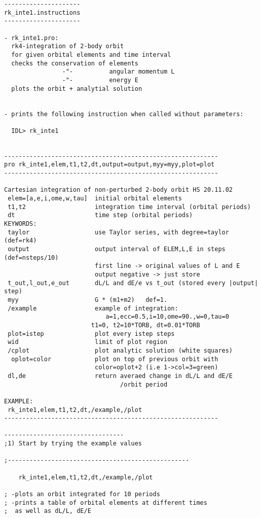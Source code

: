 \documentclass[12pt,landscape]{article}
\begin{document}
\begin{verbatim}
---------------------
rk_inte1.instructions
---------------------

- rk_inte1.pro:
  rk4-integration of 2-body orbit
  for given orbital elements and time interval 
  checks the conservation of elements
                -"-          angular momentum L
                -"-          energy E
  plots the orbit + analytial solution

                 
- prints the following instruction when called without parameters:
 
  IDL> rk_inte1


-----------------------------------------------------------
pro rk_inte1,elem,t1,t2,dt,output=output,myy=myy,plot=plot
-----------------------------------------------------------
 
Cartesian integration of non-perturbed 2-body orbit HS 20.11.02
 elem=[a,e,i,ome,w,tau]  initial orbital elements
 t1,t2                   integration time interval (orbital periods)
 dt                      time step (orbital periods)
KEYWORDS:
 taylor                  use Taylor series, with degree=taylor (def=rk4)
 output                  output interval of ELEM,L,E in steps (def=nsteps/10)
                         first line -> original values of L and E 
                         output negative -> just store  
 t_out,l_out,e_out       dL/L and dE/e vs t_out (stored every |output| step)
 myy                     G * (m1+m2)   def=1.
 /example                example of integration:
                            a=1,ecc=0.5,i=10,ome=90.,w=0,tau=0
	                    t1=0, t2=10*TORB, dt=0.01*TORB
 plot=istep              plot every istep steps
 wid                     limit of plot region
 /cplot                  plot analytic solution (white squares)
  oplot=color            plot on top of previous orbit with
                         color=oplot+2 (i.e 1->col=3=green)  
 dl,de                   return averaed change in dL/L and dE/E  
                                /orbit period

EXAMPLE:
 rk_inte1,elem,t1,t2,dt,/example,/plot
-----------------------------------------------------------

---------------------------------
;1) Start by trying the example values

;--------------------------------------------------

    rk_inte1,elem,t1,t2,dt,/example,/plot

; -plots an orbit integrated for 10 periods 
; -prints a table of orbital elements at different times
;  as well as dL/L, dE/E


\end{verbatim}
\end{document}

